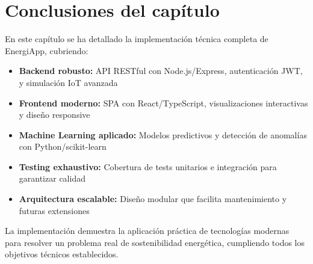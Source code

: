 \section{Conclusiones del capítulo}

En este capítulo se ha detallado la implementación técnica completa de EnergiApp, cubriendo:

\begin{itemize}
    \item \textbf{Backend robusto:} API RESTful con Node.js/Express, autenticación JWT, y simulación IoT avanzada
    \item \textbf{Frontend moderno:} SPA con React/TypeScript, visualizaciones interactivas y diseño responsive
    \item \textbf{Machine Learning aplicado:} Modelos predictivos y detección de anomalías con Python/scikit-learn
    \item \textbf{Testing exhaustivo:} Cobertura de tests unitarios e integración para garantizar calidad
    \item \textbf{Arquitectura escalable:} Diseño modular que facilita mantenimiento y futuras extensiones
\end{itemize}

La implementación demuestra la aplicación práctica de tecnologías modernas para resolver un problema real de sostenibilidad energética, cumpliendo todos los objetivos técnicos establecidos.
